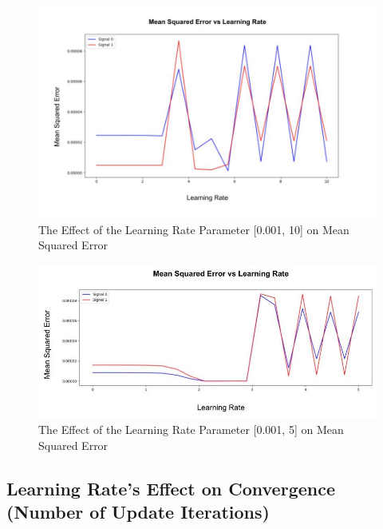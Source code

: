 \documentclass[12pt]{article}
\begin{document}
\begin{figure}[!htb] %
  \centering
  \includegraphics[width = \linewidth]{MSE_1.jpg}
  \caption{The Effect of the Learning Rate Parameter [0.001, 10] on Mean Squared Error}
\end{figure}
\FloatBarrier
\begin{figure}[!htb] %
  \centering
  \includegraphics[width = \linewidth]{MSE_2.jpg}
  \caption{The Effect of the Learning Rate Parameter [0.001, 5] on Mean Squared Error}
\end{figure}
\FloatBarrier

\subsection{Learning Rate's Effect on Convergence (Number of Update Iterations)}
\end{document}
